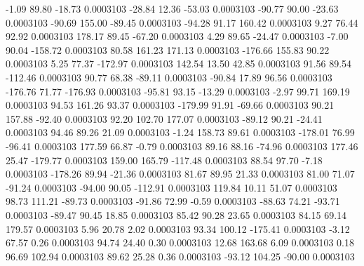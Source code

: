        -1.09       89.80      -18.73     0.0003103
      -28.84       12.36      -53.03     0.0003103
      -90.77       90.00      -23.63     0.0003103
      -90.69      155.00      -89.45     0.0003103
      -94.28       91.17      160.42     0.0003103
        9.27       76.44       92.92     0.0003103
      178.17       89.45      -67.20     0.0003103
        4.29       89.65      -24.47     0.0003103
       -7.00       90.04     -158.72     0.0003103
       80.58      161.23      171.13     0.0003103
     -176.66      155.83       90.22     0.0003103
        5.25       77.37     -172.97     0.0003103
      142.54       13.50       42.85     0.0003103
       91.56       89.54     -112.46     0.0003103
       90.77       68.38      -89.11     0.0003103
      -90.84       17.89       96.56     0.0003103
     -176.76       71.77     -176.93     0.0003103
      -95.81       93.15      -13.29     0.0003103
       -2.97       99.71      169.19     0.0003103
       94.53      161.26       93.37     0.0003103
     -179.99       91.91      -69.66     0.0003103
       90.21      157.88      -92.40     0.0003103
       92.20      102.70      177.07     0.0003103
      -89.12       90.21      -24.41     0.0003103
       94.46       89.26       21.09     0.0003103
       -1.24      158.73       89.61     0.0003103
     -178.01       76.99      -96.41     0.0003103
      177.59       66.87       -0.79     0.0003103
       89.16       88.16      -74.96     0.0003103
      177.46       25.47     -179.77     0.0003103
      159.00      165.79     -117.48     0.0003103
       88.54       97.70       -7.18     0.0003103
     -178.26       89.94      -21.36     0.0003103
       81.67       89.95       21.33     0.0003103
       81.00       71.07      -91.24     0.0003103
      -94.00       90.05     -112.91     0.0003103
      119.84       10.11       51.07     0.0003103
       98.73      111.21      -89.73     0.0003103
      -91.86       72.99       -0.59     0.0003103
      -88.63       74.21      -93.71     0.0003103
      -89.47       90.45       18.85     0.0003103
       85.42       90.28       23.65     0.0003103
       84.15       69.14      179.57     0.0003103
        5.96       20.78        2.02     0.0003103
       93.34      100.12     -175.41     0.0003103
       -3.12       67.57        0.26     0.0003103
       94.74       24.40        0.30     0.0003103
       12.68      163.68        6.09     0.0003103
        0.18       96.69      102.94     0.0003103
       89.62       25.28        0.36     0.0003103
      -93.12      104.25      -90.00     0.0003103
